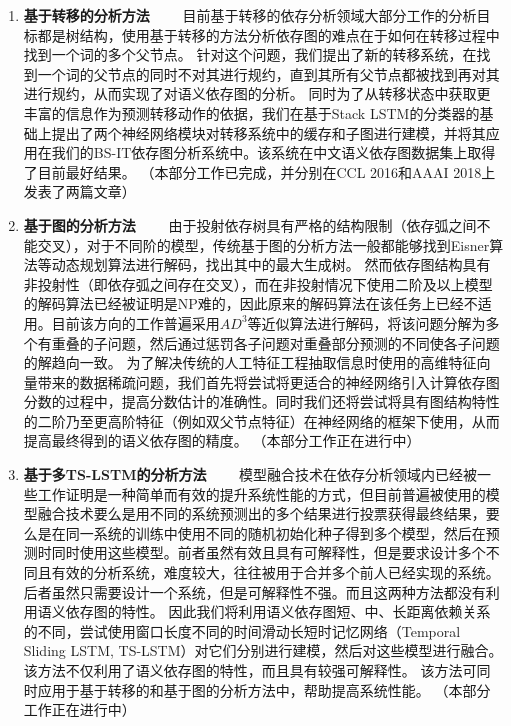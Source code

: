 \begin{enumerate}
	\item \textbf{基于转移的分析方法}
	\ \ \ \ 目前基于转移的依存分析领域大部分工作的分析目标都是树结构，使用基于转移的方法分析依存图的难点在于如何在转移过程中找到一个词的多个父节点。
	针对这个问题，我们提出了新的转移系统，在找到一个词的父节点的同时不对其进行规约，直到其所有父节点都被找到再对其进行规约，从而实现了对语义依存图的分析。
	同时为了从转移状态中获取更丰富的信息作为预测转移动作的依据，我们在基于Stack LSTM的分类器的基础上提出了两个神经网络模块对转移系统中的缓存和子图进行建模，并将其应用在我们的BS-IT依存图分析系统中。该系统在中文语义依存图数据集上取得了目前最好结果。
	（本部分工作已完成，并分别在CCL 2016和AAAI 2018上发表了两篇文章）
	
	\item \textbf{基于图的分析方法}
	\ \ \ \ 由于投射依存树具有严格的结构限制（依存弧之间不能交叉），对于不同阶的模型，传统基于图的分析方法一般都能够找到Eisner算法等动态规划算法进行解码，找出其中的最大生成树。
	然而依存图结构具有非投射性（即依存弧之间存在交叉），而在非投射情况下使用二阶及以上模型的解码算法已经被证明是NP难的，因此原来的解码算法在该任务上已经不适用。目前该方向的工作普遍采用$AD^3$等近似算法进行解码，将该问题分解为多个有重叠的子问题，然后通过惩罚各子问题对重叠部分预测的不同使各子问题的解趋向一致。
	为了解决传统的人工特征工程抽取信息时使用的高维特征向量带来的数据稀疏问题，我们首先将尝试将更适合的神经网络引入计算依存图分数的过程中，提高分数估计的准确性。同时我们还将尝试将具有图结构特性的二阶乃至更高阶特征（例如双父节点特征）在神经网络的框架下使用，从而提高最终得到的语义依存图的精度。
	（本部分工作正在进行中）
	
	\item \textbf{基于多TS-LSTM的分析方法}
	\ \ \ \ 模型融合技术在依存分析领域内已经被一些工作证明是一种简单而有效的提升系统性能的方式，但目前普遍被使用的模型融合技术要么是用不同的系统预测出的多个结果进行投票获得最终结果，要么是在同一系统的训练中使用不同的随机初始化种子得到多个模型，然后在预测时同时使用这些模型。前者虽然有效且具有可解释性，但是要求设计多个不同且有效的分析系统，难度较大，往往被用于合并多个前人已经实现的系统。后者虽然只需要设计一个系统，但是可解释性不强。而且这两种方法都没有利用语义依存图的特性。
	因此我们将利用语义依存图短、中、长距离依赖关系的不同，尝试使用窗口长度不同的时间滑动长短时记忆网络（Temporal Sliding LSTM, TS-LSTM）对它们分别进行建模，然后对这些模型进行融合。该方法不仅利用了语义依存图的特性，而且具有较强可解释性。
	该方法可同时应用于基于转移的和基于图的分析方法中，帮助提高系统性能。
	（本部分工作正在进行中）
	

\end{enumerate}
